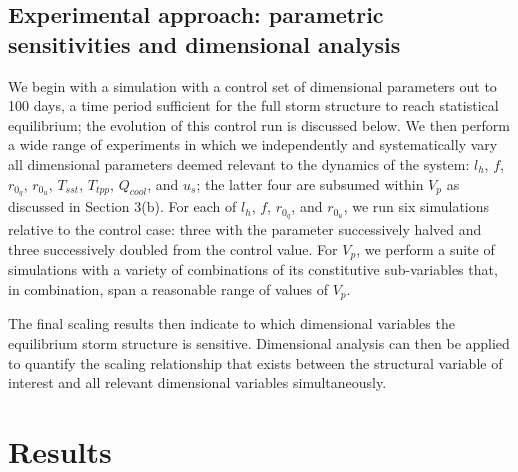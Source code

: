 \documentclass[12pt]{article}
\begin{document}
\subsection{Experimental approach: parametric sensitivities and dimensional analysis}
We begin with a simulation with a control set of dimensional parameters out to 100 days, a time period sufficient for the full storm structure to reach statistical equilibrium; the evolution of this control run is discussed below.  We then perform a wide range of experiments in which we independently and systematically vary all dimensional parameters deemed relevant to the dynamics of the system: $l_h$, $f$, $r_{0_q}$, $r_{0_u}$, $T_{sst}$, $T_{tpp}$, $Q_{cool}$, and $u_s$; the latter four are subsumed within $V_p$ as discussed in Section 3(b).  For each of $l_h$, $f$, $r_{0_q}$, and $r_{0_u}$, we run six simulations relative to the control case: three with the parameter successively halved and three successively doubled from the control value.  For $V_p$, we perform a suite of simulations with a variety of combinations of its constitutive sub-variables that, in combination, span a reasonable range of values of $V_p$.

The final scaling results then indicate to which dimensional variables the equilibrium storm structure is sensitive.  Dimensional analysis can then be applied to quantify the scaling relationship that exists between the structural variable of interest and all relevant dimensional variables simultaneously.

\section{Results}

\end{document}
